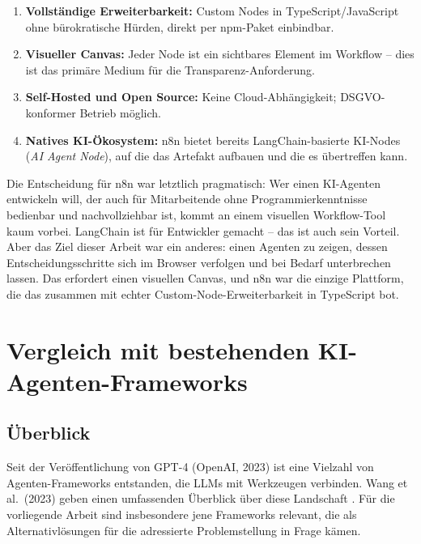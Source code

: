 \documentclass[12pt,a4paper,oneside]{report}
\begin{document}
\begin{enumerate}
  \item \textbf{Vollständige Erweiterbarkeit:} Custom Nodes in TypeScript/JavaScript
    ohne bürokratische Hürden, direkt per npm-Paket einbindbar.
  \item \textbf{Visueller Canvas:} Jeder Node ist ein sichtbares Element im Workflow --
    dies ist das primäre Medium für die Transparenz-Anforderung.
  \item \textbf{Self-Hosted und Open Source:} Keine Cloud-Abhängigkeit; DSGVO-konformer
    Betrieb möglich.
  \item \textbf{Natives KI-Ökosystem:} n8n bietet bereits LangChain-basierte
    KI-Nodes (\textit{AI Agent Node}), auf die das Artefakt aufbauen und die es
    übertreffen kann.
\end{enumerate}

Die Entscheidung für n8n war letztlich pragmatisch: Wer einen KI-Agenten entwickeln
will, der auch für Mitarbeitende ohne Programmierkenntnisse bedienbar und
nachvollziehbar ist, kommt an einem visuellen Workflow-Tool kaum vorbei. LangChain
ist für Entwickler gemacht -- das ist auch sein Vorteil. Aber das Ziel dieser Arbeit
war ein anderes: einen Agenten zu zeigen, dessen Entscheidungsschritte sich im Browser
verfolgen und bei Bedarf unterbrechen lassen. Das erfordert einen visuellen Canvas, und
n8n war die einzige Plattform, die das zusammen mit echter Custom-Node-Erweiterbarkeit
in TypeScript bot.

\section{Vergleich mit bestehenden KI-Agenten-Frameworks}
\label{sec:agent-comparison}

\subsection{Überblick}

Seit der Veröffentlichung von GPT-4 (OpenAI, 2023) ist eine Vielzahl von
Agenten-Frameworks entstanden, die \ac{LLM}s mit Werkzeugen verbinden. Wang et al.\
(2023) geben einen umfassenden Überblick über diese Landschaft \cite{wang2023survey}.
Für die vorliegende Arbeit sind insbesondere jene Frameworks relevant, die als
Alternativlösungen für die adressierte Problemstellung in Frage kämen.
\end{document}
